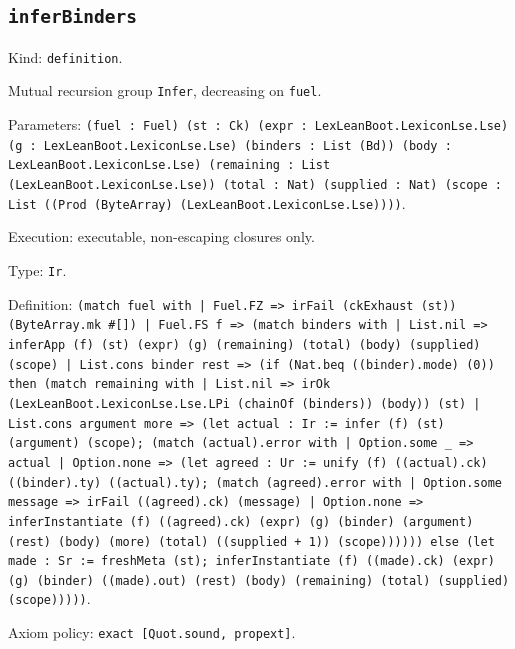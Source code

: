 \documentclass[11pt]{article}
\begin{document}
\subsection*{\texttt{inferBinders}}
\noindent Kind: \texttt{definition}.\par
\noindent Mutual recursion group \texttt{Infer}, decreasing on \texttt{fuel}.\par
\noindent Parameters: \texttt{(fuel : Fuel) (st : Ck) (expr : LexLeanBoot.LexiconLse.Lse) (g : LexLeanBoot.LexiconLse.Lse) (binders : List (Bd)) (body : LexLeanBoot.LexiconLse.Lse) (remaining : List (LexLeanBoot.LexiconLse.Lse)) (total : Nat) (supplied : Nat) (scope : List ((Prod (ByteArray) (LexLeanBoot.LexiconLse.Lse))))}.\par
\noindent Execution: executable, non-escaping closures only.\par
\noindent Type: \texttt{Ir}.\par
\noindent Definition: \texttt{(match fuel with | Fuel.FZ => irFail (ckExhaust (st)) (ByteArray.mk \#[]) | Fuel.FS f => (match binders with | List.nil => inferApp (f) (st) (expr) (g) (remaining) (total) (body) (supplied) (scope) | List.cons binder rest => (if (Nat.beq ((binder).mode) (0)) then (match remaining with | List.nil => irOk (LexLeanBoot.LexiconLse.Lse.LPi (chainOf (binders)) (body)) (st) | List.cons argument more => (let actual : Ir := infer (f) (st) (argument) (scope); (match (actual).error with | Option.some \_ => actual | Option.none => (let agreed : Ur := unify (f) ((actual).ck) ((binder).ty) ((actual).ty); (match (agreed).error with | Option.some message => irFail ((agreed).ck) (message) | Option.none => inferInstantiate (f) ((agreed).ck) (expr) (g) (binder) (argument) (rest) (body) (more) (total) ((supplied + 1)) (scope)))))) else (let made : Sr := freshMeta (st); inferInstantiate (f) ((made).ck) (expr) (g) (binder) ((made).out) (rest) (body) (remaining) (total) (supplied) (scope)))))}.\par
\noindent Axiom policy: \texttt{exact [Quot.sound, propext]}.\par
\end{document}
